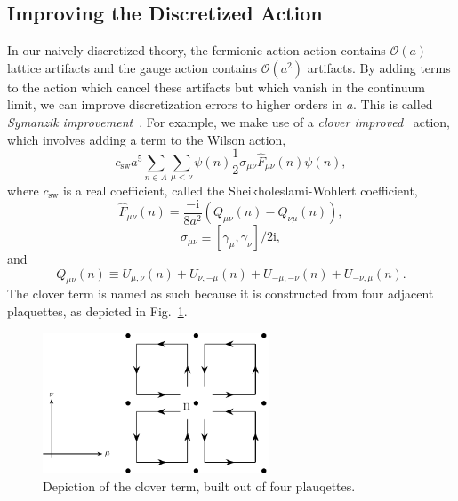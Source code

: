 \subsection{Improving the Discretized Action}\label{sec:improved_action}
In our naively discretized theory, the fermionic action action contains $\mathcal O(a)$ lattice artifacts and the gauge action contains $\mathcal O(a^2)$ artifacts. By adding terms to the action which cancel these artifacts but which vanish in the continuum limit, we can improve discretization errors to higher orders in $a$. This is called \emph{Symanzik improvement}~\cite{Symanzik:1983dc}. For example, we make use of a \emph{clover improved}~\cite{Sheikholeslami:1985ij} action, which involves adding a term to the Wilson action,
\begin{equation}
    c_{\mathrm{sw}} a^{5} \sum_{n \in \Lambda} \sum_{\mu<\nu} \bar{\psi}(n) \frac{1}{2} \sigma_{\mu \nu} \widehat{F}_{\mu \nu}(n) \psi(n),
\end{equation}
where $c_{\mathrm{sw}}$ is a real coefficient, called the Sheikholeslami-Wohlert coefficient,
\begin{equation}
    \widehat{F}_{\mu \nu}(n)=\frac{-\mathrm{i}}{8 a^{2}}\left(Q_{\mu \nu}(n)-Q_{\nu \mu}(n)\right),
\end{equation}
\begin{equation}
    \sigma_{\mu \nu} \equiv\left[\gamma_{\mu}, \gamma_{\nu}\right] / 2 \mathrm{i},
\end{equation}
and
\begin{equation}
    Q_{\mu \nu}(n) \equiv U_{\mu, \nu}(n)+U_{\nu,-\mu}(n)+U_{-\mu,-\nu}(n)+U_{-\nu, \mu}(n).
\end{equation}
The clover term is named as such because it is constructed from four adjacent plaquettes, as depicted in Fig.~\ref{fig:clover}.
\begin{figure}
    \centering
    \hspace*{-1in}\includegraphics[width=0.6\textwidth]{figures/clover.pdf}
    \caption{Depiction of the clover term, built out of four plauqettes.}
    \label{fig:clover}
\end{figure}

